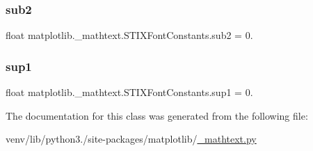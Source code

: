 \subsubsection{\texorpdfstring{sub2}{sub2}}
{\footnotesize\ttfamily float matplotlib.\+\_\+mathtext.\+S\+T\+I\+X\+Font\+Constants.\+sub2 = 0.\hspace{0.3cm}{\ttfamily [static]}}

\mbox{\label{classmatplotlib_1_1__mathtext_1_1STIXFontConstants_ab5fdfe8740306f5764391aa173dcac7a}} 
\subsubsection{\texorpdfstring{sup1}{sup1}}
{\footnotesize\ttfamily float matplotlib.\+\_\+mathtext.\+S\+T\+I\+X\+Font\+Constants.\+sup1 = 0.\hspace{0.3cm}{\ttfamily [static]}}



The documentation for this class was generated from the following file\+:\begin{DoxyCompactItemize}
\item 
venv/lib/python3./site-\/packages/matplotlib/\hyperlink{__mathtext_8py}{\+\_\+mathtext.\+py}\end{DoxyCompactItemize}
